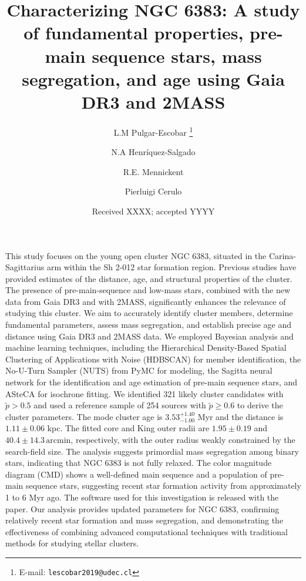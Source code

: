 \documentclass{aa}
\begin{document}
\raggedbottom
{}

   \title{Characterizing NGC 6383: A study of fundamental properties, pre-main sequence stars, mass segregation, and age using Gaia DR3 and 2MASS}

   \author{L.M Pulgar-Escobar
          \thanks{E-mail: \texttt{lescobar2019@udec.cl}}
          \and
        N.A Henríquez-Salgado
        \and 
        R.E. Mennickent
        \and
        Pierluigi Cerulo
          }


   \date{Received XXXX; accepted YYYY}

  \abstract
   {This study focuses on the young open cluster NGC 6383, situated in the Carina-Sagittarius arm within the Sh 2-012 star formation region. Previous studies have provided estimates of the distance, age, and structural properties of the cluster. The presence of pre-main-sequence and low-mass stars, combined with the new data from Gaia DR3 and with 2MASS, significantly enhances the relevance of studying this cluster.}
   {We aim to accurately identify cluster members, determine fundamental parameters, assess mass segregation, and establish precise age and distance using Gaia DR3 and 2MASS data.}
   {We employed Bayesian analysis and machine learning techniques, including the Hierarchical Density-Based Spatial Clustering of Applications with Noise (HDBSCAN) for member identification, the No-U-Turn Sampler (NUTS) from PyMC for modeling, the Sagitta neural network for the identification and age estimation of pre-main sequence stars, and ASteCA for isochrone fitting.}   
   {We identified 321 likely cluster candidates with $\tilde{p}>0.5$ and used a reference sample of 254 sources with $\tilde{p}\geq0.6$ to derive the cluster parameters. The mode cluster age is $3.53^{+1.40}_{-1.00}$ Myr and the distance is $1.11\pm 0.06$ kpc. The fitted core and King outer radii are $1.95 \pm 0.19$ and $40.4 \pm 14.3\,\mathrm{arcmin}$, respectively, with the outer radius weakly constrained by the search-field size. The analysis suggests primordial mass segregation among binary stars, indicating that NGC 6383 is not fully relaxed. The color magnitude diagram (CMD) shows a well-defined main sequence and a population of pre-main sequence stars, suggesting recent star formation activity from approximately 1 to 6 Myr ago. The software used for this investigation is released with the paper.}
   {Our analysis provides updated parameters for NGC 6383, confirming relatively recent star formation and mass segregation, and demonstrating the effectiveness of combining advanced computational techniques with traditional methods for studying stellar clusters.}
\end{document}
